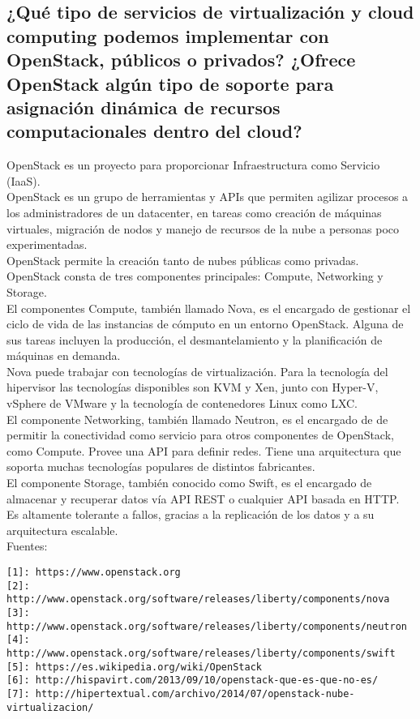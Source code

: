 \documentclass[12pt,a4paper,twoside,openright,titlepage,final]{article}
\begin{document}
\subsection{¿Qué tipo de servicios de virtualización y cloud computing podemos implementar con OpenStack, públicos o privados? ¿Ofrece OpenStack algún tipo de soporte para asignación dinámica de recursos computacionales dentro del cloud?}

OpenStack es un proyecto para proporcionar Infraestructura como Servicio (IaaS).\\

OpenStack es un grupo de herramientas  y APIs que permiten agilizar procesos a los administradores de un datacenter, en tareas como creación de máquinas virtuales, migración de nodos y manejo de recursos de la nube a personas poco experimentadas.\\

OpenStack permite la creación tanto de nubes públicas como privadas.\\

OpenStack consta de tres componentes principales: Compute, Networking y Storage.\\

El componentes Compute, también llamado Nova, es el encargado de gestionar el ciclo de vida de las instancias de cómputo en un entorno OpenStack. Alguna de sus tareas incluyen la producción, el desmantelamiento y la planificación de máquinas en demanda.\\

Nova puede trabajar con tecnologías de virtualización. Para la tecnología del hipervisor las tecnologías disponibles son KVM y Xen, junto con Hyper-V, vSphere de VMware y la tecnología de contenedores Linux como LXC.\\

El componente Networking, también llamado Neutron, es el encargado de de permitir la conectividad como servicio para otros componentes de OpenStack, como Compute. Provee una API para definir redes. Tiene una arquitectura que soporta muchas tecnologías populares de distintos fabricantes. \\

El componente Storage, también conocido como Swift, es el encargado de almacenar y recuperar datos vía API REST o cualquier API basada en HTTP. Es altamente tolerante a fallos, gracias a la replicación de los datos y a su arquitectura escalable.\\

Fuentes:\\
\begin{verbatim}
[1]: https://www.openstack.org
[2]: http://www.openstack.org/software/releases/liberty/components/nova
[3]: http://www.openstack.org/software/releases/liberty/components/neutron
[4]: http://www.openstack.org/software/releases/liberty/components/swift
[5]: https://es.wikipedia.org/wiki/OpenStack
[6]: http://hispavirt.com/2013/09/10/openstack-que-es-que-no-es/
[7]: http://hipertextual.com/archivo/2014/07/openstack-nube-virtualizacion/
\end{verbatim}
\end{document}
